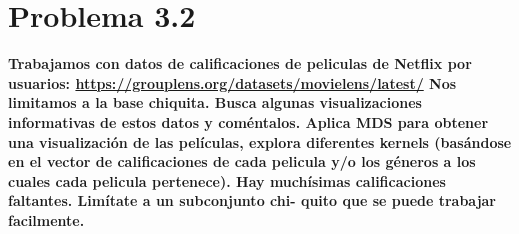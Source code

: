 \section*{Problema 3.2}

\textbf{Trabajamos con datos de calificaciones de peliculas de Netflix por usuarios: \url{https://grouplens.org/datasets/movielens/latest/} Nos limitamos a la base chiquita. Busca algunas visualizaciones informativas de estos datos y coméntalos. Aplica MDS para obtener una visualización de las películas, explora diferentes kernels (basándose en el vector de calificaciones de cada pelicula y/o los géneros a los cuales cada pelicula pertenece). Hay muchísimas calificaciones faltantes. Limítate a un subconjunto chi- quito que se puede trabajar facilmente.}
